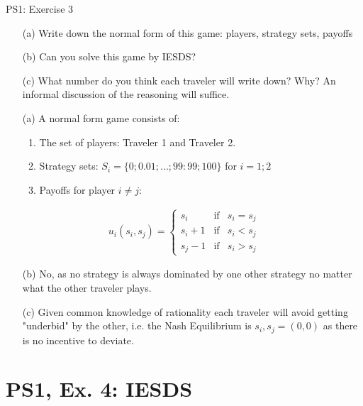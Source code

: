 \begin{frame}{PS1: Exercise 3}
\begin{multicols}{2}
  \begin{itemize}
    \item[(a)] Write down the normal form of this game: players, strategy sets, payoffs
  \item[(b)] Can you solve this game by IESDS?
  \item[(c)] What number do you think each traveler will write down? Why? An informal
  discussion of the reasoning will suffice.
  \end{itemize}
\vfill\null \columnbreak
\begin{itemize}
  \item[(a)] A normal form game consists of:
    \begin{enumerate}
      \item The set of players: Traveler 1 and Traveler 2.
      \item Strategy sets: $S_i = \{0; 0.01; ... ; 99:99; 100\}$ for $i = 1; 2$
      \item Payoffs for player $i\neq j$:
    \end{enumerate}
\end{itemize}
\begin{align*}
  u_i(s_i,s_j)=
  \left\{ \begin{array}{ccl}
  s_i   & \mbox{if} & s_i=s_j \\
  s_i+1 & \mbox{if} & s_i<s_j \\
  s_j-1 & \mbox{if} & s_i>s_j
  \end{array}\right.
\end{align*}
\begin{itemize}
  \item[(b)] No, as no strategy is always dominated by one other strategy no matter what the other traveler plays.
  \item[(c)] Given common knowledge of rationality each traveler will avoid getting "underbid" by the other, i.e. the Nash Equilibrium is $s_i,s_j=(0,0)$ as there is no incentive to deviate.
\end{itemize}
\vfill\null
\end{multicols}
\end{frame}


\section{PS1, Ex. 4: IESDS}

